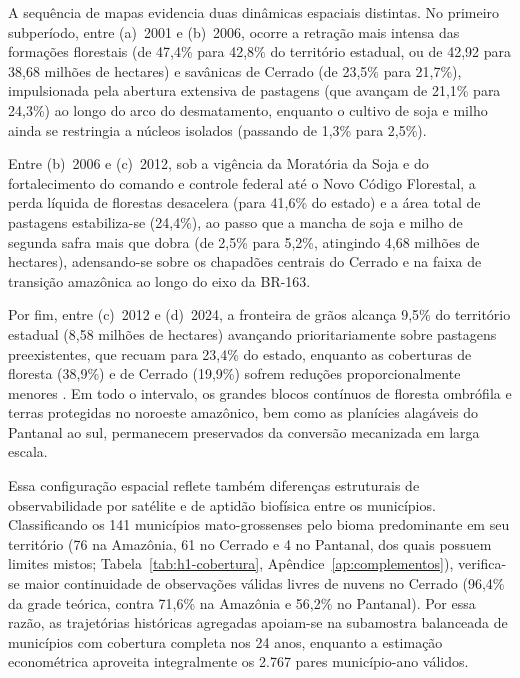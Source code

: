 A sequência de mapas evidencia duas dinâmicas espaciais distintas. No primeiro subperíodo, entre (a)~2001 e (b)~2006, ocorre a retração mais intensa das formações florestais (de 47,4\% para 42,8\% do território estadual, ou de 42,92 para 38,68 milhões de hectares) e savânicas de Cerrado (de 23,5\% para 21,7\%), impulsionada pela abertura extensiva de pastagens (que avançam de 21,1\% para 24,3\%) ao longo do arco do desmatamento, enquanto o cultivo de soja e milho ainda se restringia a núcleos isolados (passando de 1,3\% para 2,5\%). 

Entre (b)~2006 e (c)~2012, sob a vigência da Moratória da Soja e do fortalecimento do comando e controle federal até o Novo Código Florestal, a perda líquida de florestas desacelera (para 41,6\% do estado) e a área total de pastagens estabiliza-se (24,4\%), ao passo que a mancha de soja e milho de segunda safra mais que dobra (de 2,5\% para 5,2\%, atingindo 4,68 milhões de hectares), adensando-se sobre os chapadões centrais do Cerrado e na faixa de transição amazônica ao longo do eixo da BR-163. 

Por fim, entre (c)~2012 e (d)~2024, a fronteira de grãos alcança 9,5\% do território estadual (8,58 milhões de hectares) avançando prioritariamente sobre pastagens preexistentes, que recuam para 23,4\% do estado, enquanto as coberturas de floresta (38,9\%) e de Cerrado (19,9\%) sofrem reduções proporcionalmente menores \cite{MacedoEtAl2012, Spera2017, SimoesEtAl2020}. Em todo o intervalo, os grandes blocos contínuos de floresta ombrófila e terras protegidas no noroeste amazônico, bem como as planícies alagáveis do Pantanal ao sul, permanecem preservados da conversão mecanizada em larga escala.

Essa configuração espacial reflete também diferenças estruturais de observabilidade por satélite e de aptidão biofísica entre os municípios. Classificando os 141 municípios mato-grossenses pelo bioma predominante em seu território (76 na Amazônia, 61 no Cerrado e 4 no Pantanal, dos quais \Hmixed{} possuem limites mistos; Tabela~\ref{tab:h1-cobertura}, Apêndice~\ref{ap:complementos}), verifica-se maior continuidade de observações válidas livres de nuvens no Cerrado (96,4\% da grade teórica, contra 71,6\% na Amazônia e 56,2\% no Pantanal). Por essa razão, as trajetórias históricas agregadas apoiam-se na subamostra balanceada de \Hfixed{} municípios com cobertura completa nos 24 anos, enquanto a estimação econométrica aproveita integralmente os 2.767 pares município-ano válidos. 

